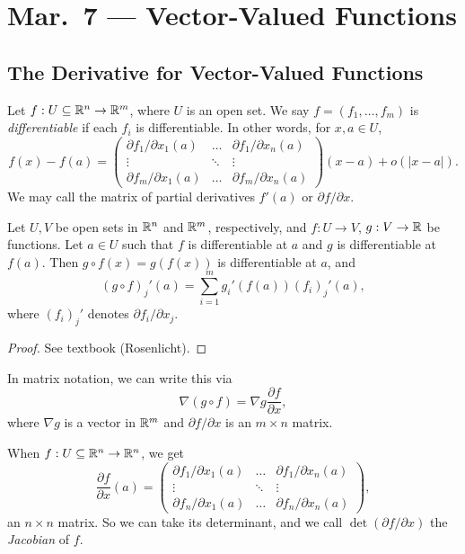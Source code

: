 \chapter{Mar.~7 --- Vector-Valued Functions}

\section{The Derivative for Vector-Valued Functions}

\begin{definition}
  Let $f : U \subseteq \mathbb{R}^n \to \mathbb{R}^m$, where $U$ is an
  open set. We say $f = (f_1, \dots, f_m)$ is
  \emph{differentiable} if each $f_i$ is differentiable.
  In other words, for $x, a \in U$,
  \[
    f(x) - f(a)
    =
    \begin{pmatrix}
      \partial f_1 / \partial x_1 (a) & \dots & \partial f_1 / \partial x_n (a) \\
      \vdots & \ddots & \vdots \\
      \partial f_m / \partial x_1 (a) & \dots & \partial f_m / \partial x_n (a)
    \end{pmatrix}
    (x - a)
    + o(|x - a|).
  \]
  We may call the matrix of partial derivatives
  $f'(a)$ or $\partial f / \partial x$.
\end{definition}

\begin{theorem}
  Let $U, V$ be open sets in $\mathbb{R}^n$ and $\mathbb{R}^m$,
  respectively, and $f : U \to V$, $g : V \to \mathbb{R}$ be
  functions. Let $a \in U$ such that $f$ is
  differentiable at $a$ and $g$ is differentiable at
  $f(a)$. Then $g \circ f(x) = g(f(x))$ is
  differentiable at $a$, and
  \[
    (g \circ f)_j' (a) = \sum_{i=1}^m g_i'(f(a)) (f_i)_j'(a),
  \]
  where $(f_i)_j'$ denotes $\partial f_i / \partial x_j$.
\end{theorem}

\begin{proof}
  See textbook (Rosenlicht).
\end{proof}

\begin{remark}
  In matrix notation, we can write this via
  \[
    \nabla (g \circ f) = \nabla g \frac{\partial f}{\partial x},
  \]
  where $\nabla g$ is a vector in $\mathbb{R}^m$ and
  $\partial f / \partial x$ is an $m \times n$ matrix.
\end{remark}

\begin{remark}
  When $f : U \subseteq \mathbb{R}^n \to \mathbb{R}^n$, we get
  \[
    \frac{\partial f}{\partial x}(a)
    =
    \begin{pmatrix}
      \partial f_1 / \partial x_1 (a) & \dots & \partial f_1 / \partial x_n (a) \\
      \vdots & \ddots & \vdots \\
      \partial f_n / \partial x_1 (a) & \dots & \partial f_n / \partial x_n (a)
    \end{pmatrix},
  \]
  an $n \times n$ matrix. So we can take its
  determinant, and we call $\det(\partial f / \partial x)$
  the \emph{Jacobian} of $f$.
\end{remark}

